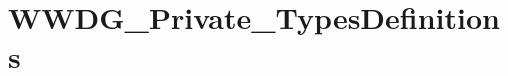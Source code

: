 \hypertarget{group___w_w_d_g___private___types_definitions}{\section{W\-W\-D\-G\-\_\-\-Private\-\_\-\-Types\-Definitions}
\label{group___w_w_d_g___private___types_definitions}
}
